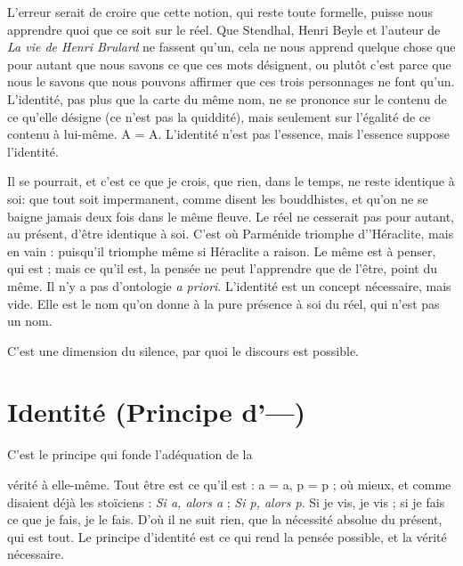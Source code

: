 L'erreur serait de croire que cette notion, qui reste toute formelle, puisse
nous apprendre quoi que ce soit sur le réel. Que Stendhal, Henri Beyle et
l’auteur de {\it La vie de Henri Brulard} ne fassent qu’un, cela ne nous apprend
quelque chose que pour autant que nous savons ce que ces mots désignent, ou
plutôt c’est parce que nous le savons que nous pouvons affirmer que ces trois
personnages ne font qu’un. L'identité, pas plus que la carte du même nom, ne
se prononce sur le contenu de ce qu’elle désigne (ce n’est pas la quiddité), mais
seulement sur l'égalité de ce contenu à lui-même. A = A. L'identité n’est pas
l'essence, mais l'essence suppose l'identité.

Il se pourrait, et c’est ce que je crois, que rien, dans le temps, ne reste identique
à soi: que tout soit impermanent, comme disent les bouddhistes, et
qu'on ne se baigne jamais deux fois dans le même fleuve. Le réel ne cesserait pas
pour autant, au présent, d’être identique à soi. C’est où Parménide triomphe
d’'Héraclite, mais en vain : puisqu'il triomphe même si Héraclite a raison. Le
même est à penser, qui est ; mais ce qu'il est, la pensée ne peut l’apprendre que
de l'être, point du même. Il n’y a pas d’ontologie {\it a priori}. L'identité est un
concept nécessaire, mais vide. Elle est le nom qu’on donne à la pure présence à
soi du réel, qui n’est pas un nom.

C’est une dimension du silence, par quoi le discours est possible.

\section{Identité (Principe d'—)}
C’est le principe qui fonde l'adéquation de la

vérité à elle-même. Tout être est ce qu’il est :
a = a, p = p ; où mieux, et comme disaient déjà les stoïciens : {\it Si a, alors a} ; {\it Si p,
alors p}. Si je vis, je vis ; si je fais ce que je fais, je le fais. D’où il ne suit rien, que
la nécessité absolue du présent, qui est tout.
Le principe d’identité est ce qui rend la pensée possible, et la vérité nécessaire.
